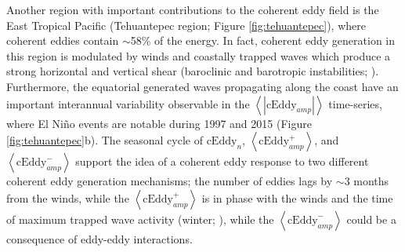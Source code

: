 \documentclass[draft,linenumbers]{agujournal2019}
\newcommand{\cEddy}{\textrm{cEddy}}
\begin{document}
	Another region with important contributions to the coherent eddy field is the East Tropical Pacific (Tehuantepec region; Figure \ref{fig:tehuantepec}), where coherent eddies contain $\sim$58\% of the energy. 
	In fact, coherent eddy generation in this region is modulated by winds and coastally trapped waves which produce a strong horizontal and vertical shear (baroclinic and barotropic instabilities; \citealp{Zamudio_Tehuantepec_2006}). 
	Furthermore, the equatorial generated waves propagating along the coast have an important interannual variability observable in the $\left<|\cEddy_{amp}|\right>$ time-series, where El Niño events are notable during 1997 and 2015 (Figure \ref{fig:tehuantepec}b). 
	The seasonal cycle of $\cEddy_{n}$, $\left<\cEddy_{amp}^+\right>$, and $\left<\cEddy_{amp}^-\right>$ support the idea of a coherent eddy response to two different coherent eddy generation mechanisms; the number of eddies lags by $\sim$3 months from the winds, while the $\left<\cEddy_{amp}^+\right>$ is in phase with the winds and the time of maximum trapped wave activity (winter; \citealp{Zamudio_Tehuantepec_2006}), while the $\left<\cEddy_{amp}^-\right>$ could be a consequence of eddy-eddy interactions. 

\end{document}

